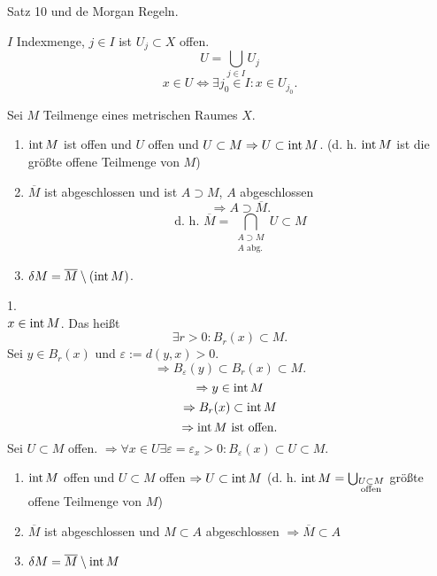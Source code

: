 \documentclass[../ana2.tex]{subfiles}
\begin{document}
\begin{bew}
    Satz 10 und de Morgan Regeln.
\end{bew}
\begin{bem}
    \( I \) Indexmenge, \( j \in I \) ist 
    \( U_j \subset X \) offen.
    \[ U = \bigcup_{j\in I} U_j \]
    \[ x \in U \Leftrightarrow \exists j_0 \in I: 
    x \in U_{j_0}. \]
\end{bem}
\begin{satz}
    Sei \( M \) Teilmenge eines metrischen 
    Raumes \( X \).
    \begin{enumerate}
        \item \( \operatorname{int} M \) ist offen und \( U \) offen 
        und \( U \subset M \Rightarrow U \subset \operatorname{int} M \).
        (d. h. \( \operatorname{int} M \) ist die größte offene Teilmenge 
        von \(M\))
        \item \( \overline{M} \) ist abgeschlossen und ist 
        \(A \supset M \), \( A \) abgeschlossen 
        \[ \Rightarrow A \supset \overline{M}. \]
        \[ \text{d. h. } \overline{M} 
        = \bigcap_{\substack{A \supset M\\A \text{ abg.}}} 
        U \subset M \]
        \item \( \delta M = \overline{M} \setminus (\operatorname{int} M) \).
    \end{enumerate}
\end{satz}
\begin{bew}
    1.\\
    \( x \in \operatorname{int} M \). Das heißt 
    \[ \exists r > 0: B_r(x) \subset M. \]
    Sei \( y \in B_r(x) \) und \( \varepsilon := d(y,x) > 0 \).
    \[ \Rightarrow B_\varepsilon(y) \subset B_r(x) 
    \subset M. \]
    \[ \Rightarrow y \in \operatorname{int} M \]
    \[ \Rightarrow B_r(x) \subset \operatorname{int} M \]
    \[ \Rightarrow \operatorname{int} M \text{ ist offen}. \]
    Sei \( U \subset M \) offen. 
    \( \Rightarrow \forall x \in U 
    \exists \varepsilon = \varepsilon_x > 0: 
    B_\varepsilon(x) \subset U \subset M \).
\end{bew}
\begin{satz*}\leavevmode
    \begin{enumerate}
        \item \( \operatorname{int} M \) offen und 
        \( U \subset M \) offen \( \Rightarrow U \subset \operatorname{int} M \)
        (d. h. \( \operatorname{int} M = \bigcup_{\substack{U \subset M \\\text{offen}}} \) 
        größte offene Teilmenge von \(M\))
        \item \( \overline{M} \) ist abgeschlossen und 
        \( M \subset A \) abgeschlossen 
        \( \Rightarrow \overline{M} \subset A \)
        \item \( \delta M = \overline{M} \setminus \operatorname{int} M \)
    \end{enumerate}
\end{satz*}
\end{document}
